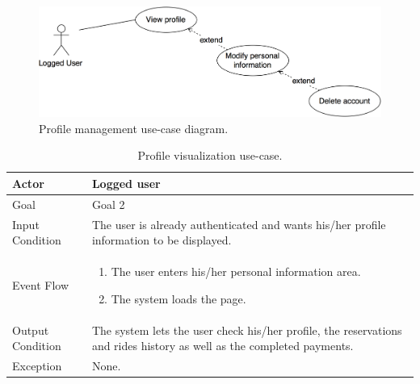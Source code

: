 \begin{figure}[H]
\begin{center}
		\includegraphics[width=\textwidth]{./specific_requirements/features/diagrams/man_profile_uc.png}
		\caption{Profile management use-case diagram.}
		\label{man_profile_uc}
\end{center}
\end{figure}

\begin{table}[H]
\begin{center}
\begin{tabular}{p{} | p{}}
\hline
Actor & Logged user\\
\hline
Goal & Goal 2\\
\hline
Input Condition & The user is already authenticated and wants his/her profile information to be displayed.\\
\hline
Event Flow & 
\begin{enumerate}
\item The user enters his/her personal information area.
\item The system loads the page.
\end{enumerate} \\
\hline
Output Condition & The system lets the user check his/her profile, the reservations and rides history as well as the completed payments.\\
\hline
Exception & 
None.\\
\hline
\end{tabular}
\end{center}
\caption{Profile visualization use-case.}
\label{view_profile_uc}
\end{table}

